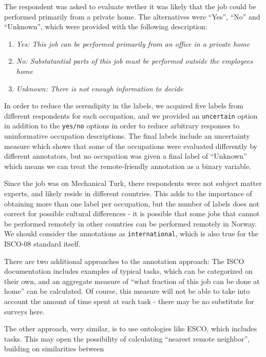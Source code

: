 \documentclass[11pt,]{article}
\begin{document}
The respondent was asked to evaluate wether it was likely that the job
could be performed primarily from a private home. The alternatives were
``Yes'', ``No'' and ``Unknown'', which were provided with the following
description:

\begin{enumerate}
\def\labelenumi{\arabic{enumi}.}
\item
  \emph{Yes: This job can be performed primarily from an office in a
  private home}
\item
  \emph{No: Substatantial parts of this job must be performed outside
  the employees home}
\item
  \emph{Unknown: There is not enough information to decide}
\end{enumerate}

In order to reduce the serendipity in the labels, we acquired five
labels from different respondents for each occupation, and we provided
an \texttt{uncertain} option in addition to the \texttt{yes/no} options
in order to reduce arbitrary responses to uninformative occupation
descriptions. The final labels include an uncertainty measure which
shows that some of the occupations were evaluated differently by
different annotators, but no occupation was given a final label of
``Unknown'' which means we can treat the remote-friendly annotation as a
binary variable.

Since the job was on Mechanical Turk, there respondents were not subject
matter experts, and likely reside in different countries. This adds to
the importance of obtaining more than one label per occupation, but the
number of labels does not correct for possible cultural differences - it
is possible that some jobs that cannot be performed remotely in other
countries can be performed remotely in Norway. We should consider the
annotations as \texttt{international}, which is also true for the
ISCO-08 standard itself.

There are two additional approaches to the annotation approach: The ISCO
documentation includes examples of typical tasks, which can be
categorized on their own, and an aggregate measure of ``what fraction of
this job can be done at home'' can be calculated. Of course, this
measure will not be able to take into account the amount of time spent
at each task - there may be no substitute for surveys here.

The other approach, very similar, is to use ontologies like ESCO, which
includes tasks. This may open the possibility of calculating ``nearest
remote neighbor'', building on similarities between
\end{document}
